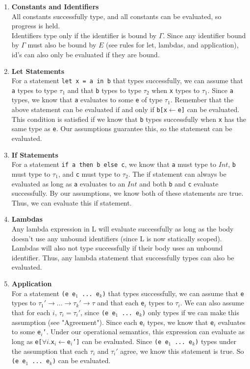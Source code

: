 \documentclass[12pt]{article}
\begin{document}
\begin{enumerate}
\item \textbf{Constants and Identifiers}\\
All constants successfully type, and all constants can be evaluated, so progress is held.\\
Identifiers type only if the identifier is bound by $\Gamma$. Since any identifier bound by $\Gamma$ must also be bound by $E$ (see rules for let, lambdas, and application), id's can also only be evaluated if they are bound.

\item \textbf{Let Statements}\\
For a statement \texttt{let x = a in b} that types successfully, we can assume that \texttt{a} types to type $\tau_1$ and that \texttt{b} types to type $\tau_2$ when \texttt{x} types to $\tau_1$. Since \texttt{a} types, we know that \texttt{a} evaluates to some \texttt{e} of type $\tau_1$. Remember that the above statement can be evaluated if and only if \texttt{b[x$\leftarrow$e]} can be evaluated. This condition is satisfied if we know that \texttt{b} types successfully when \texttt{x} has the same type as \texttt{e}. Our assumptions guarantee this, so the statement can be evaluated. 

\item \textbf{If Statements}\\
For a statement \texttt{if a then b else c}, we know that \texttt{a} must type to $Int$, \texttt{b} must type to $\tau_1$, and \texttt{c} must type to $\tau_2$. The if statement can always be evaluated as long as \texttt{a} evaluates to an $Int$ and both \texttt{b} and \texttt{c} evaluate successfully. By our assumptions, we know both of these statements are true. Thus, we can evaluate this if statement.

\item \textbf{Lambdas}\\
Any lambda expression in L will evaluate successfully as long as the body doesn't use any unbound identifiers (since L is now statically scoped). Lambdas will also not type successfully if their body uses an unbound identifier. Thus, any lambda statement that successfully types can also be evaluated.

\item \textbf{Application}\\
For a statement \texttt{(e e$_1$ ... e$_k$)} that types successfully, we can assume that \texttt{e} types to $\tau_1' \rightarrow ... \rightarrow \tau_k' \rightarrow \tau$ and that each \texttt{e$_i$} types to $\tau_i$. We can also assume that for each $i$, $\tau_i = \tau_i'$, since \texttt{(e e$_1$ ... e$_k$)} only types if we can make this assumption (see "Agreement"). Since each \texttt{e$_i$} types, we know that \texttt{e$_i$} evaluates to some \texttt{e$_i$'}. Under our operational semantics, this expression can evaluate as long as \texttt{e[$\forall i.$x$_i\leftarrow$e$_i$']} can be evaluated. Since \texttt{(e e$_1$ ... e$_k$)} types under the assumption that each $\tau_i$ and $\tau_i'$ agree, we know this statement is true. So \texttt{(e e$_1$ ... e$_k$)} can be evaluated.


\end{enumerate}
\end{document}
